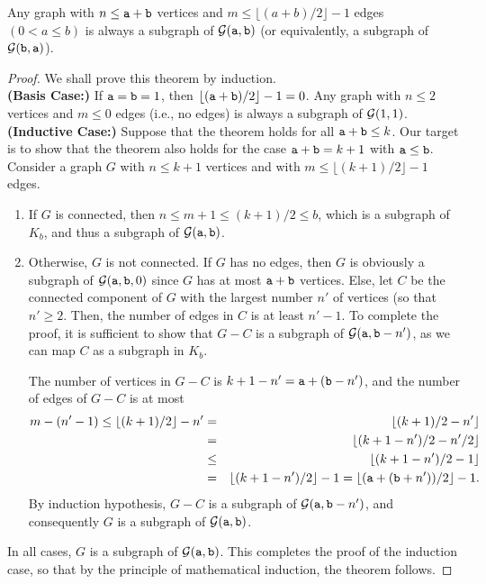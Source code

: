 \begin{theorem}
Any graph with $n \leq \mathtt{a} + \mathtt{b}$ vertices and $m \leq \lfloor (a+b)/2 \rfloor-1$ edges $(0<a \leq b)$ 
is always a subgraph of ${\cal G}(\mathtt{a},\mathtt{b})$ (or equivalently, a subgraph of ${\cal G}(\mathtt{b},\mathtt{a})$).
\end{theorem}

\begin{proof}
We shall prove this theorem by induction.  \\

\noindent
{\bf (Basis Case:)} If $\mathtt{a} = \mathtt{b} =1$, then $\lfloor (\mathtt{a}+\mathtt{b})/2 \rfloor-1 = 0$. Any graph with $n \leq 2$ vertices and $m \leq 0$ edges (i.e., no edges) is always a subgraph of ${\cal G}(1,1)$.
\\

\noindent
{\bf (Inductive Case:)} Suppose that the theorem holds for all $\mathtt{a} + \mathtt{b} \leq k$.  Our target is to show that the theorem also holds for the case $\mathtt{a} + \mathtt{b} = k + 1$ with $\mathtt{a} \leq \mathtt{b}$.   Consider a graph $G$ with  $n \leq k+1$ vertices and with $m \leq \lfloor (k+1)/2 \rfloor -1$ edges. 

\begin{enumerate}
  \item If $G$ is connected, then $n \leq m + 1 \leq (k+1)/2 \leq b$, which is a subgraph of $K_b$, 
           and thus a subgraph of ${\cal G}(\mathtt{a},\mathtt{b})$.   

  \item Otherwise, $G$ is not connected.  If $G$ has no edges, then $G$ is obviously a subgraph of ${\cal G}(\mathtt{a},\mathtt{b},0)$ 
          since $G$ has at most $\mathtt{a}+\mathtt{b}$ vertices.
          Else, let $C$ be the connected component of $G$ with the largest number $n'$ of vertices (so that $n' \geq 2$.
          Then, the number of edges in $C$ is at least $n'-1$.  To complete the proof, it is sufficient to show 
          that $G - C$ is a subgraph of ${\cal G}(\mathtt{a}, \mathtt{b} - n')$, as we can map $C$ as a subgraph in $K_b$.

The number of vertices in $G-C$ is $k+1-n' = \mathtt{a} + (\mathtt{b}-n')$, and the number of edges of $G-C$ is at most 
\begin{eqnarray*}
m - (n'-1) \leq \lfloor(k+1)/2\rfloor - n' &=& \lfloor(k+1)/2 - n'\rfloor \\
&=& \lfloor (k+1-n')/2 - n'/2 \rfloor \\
&\leq& \lfloor (k+1-n')/2 - 1 \rfloor \\
&=& \lfloor(k+1-n')/2\rfloor - 1 = \lfloor (\mathtt{a} + (\mathtt{b}+n'))/2 \rfloor - 1.
\end{eqnarray*}
By induction hypothesis, $G-C$ is a subgraph of ${\cal G}(\mathtt{a}, \mathtt{b}-n')$, 
and consequently $G$ is a subgraph of ${\cal G}(\mathtt{a},\mathtt{b})$.
\end{enumerate}
In all cases, $G$ is a subgraph of ${\cal G}(\mathtt{a},\mathtt{b})$.  This completes the proof of the induction case, so that by the principle of mathematical induction, the theorem follows.
\end{proof}

